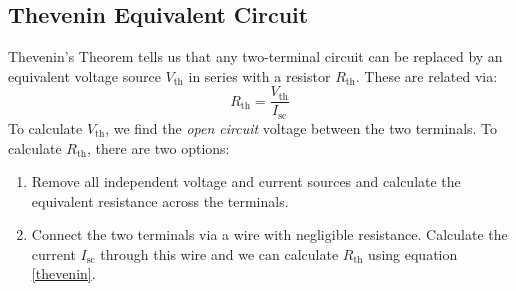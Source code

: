 \documentclass{article}
\begin{document}
\subsection{Thevenin Equivalent Circuit}
Thevenin's Theorem tells us that any two-terminal circuit can be replaced by an equivalent voltage source $V_\text{th}$ in series with a resistor $R_\text{th}$. These are related via:
\begin{equation}
    \label{thevenin}
    R_\text{th} = \frac{V_\text{th}}{I_\text{sc}}
\end{equation} 
To calculate $V_\text{th}$, we find the \textit{open circuit} voltage between the two terminals. To calculate $R_\text{th}$, there are two options:
\begin{enumerate}
    \item Remove all independent voltage and current sources and calculate the equivalent resistance across the terminals.
    \item Connect the two terminals via a wire with negligible resistance. Calculate the current $I_\text{sc}$ through this wire and we can calculate $R_\text{th}$ using equation \ref{thevenin}.
\end{enumerate}
\end{document}
